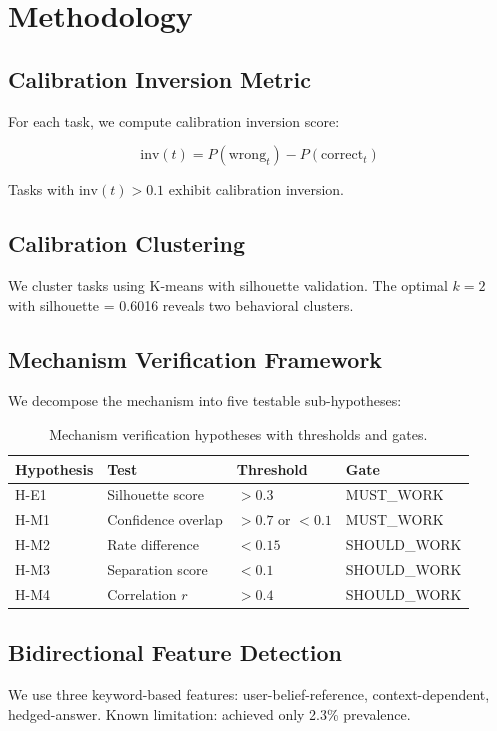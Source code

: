 \section{Methodology}

\subsection{Calibration Inversion Metric}

For each task, we compute calibration inversion score:

\begin{equation}
\text{inv}(t) = P(\text{wrong}_t) - P(\text{correct}_t)
\end{equation}

Tasks with $\text{inv}(t) > 0.1$ exhibit calibration inversion.

\subsection{Calibration Clustering}

We cluster tasks using K-means with silhouette validation. The optimal $k=2$ with silhouette = 0.6016 reveals two behavioral clusters.

\subsection{Mechanism Verification Framework}

We decompose the mechanism into five testable sub-hypotheses:

\begin{table}[h]
\centering
\begin{tabular}{@{}llll@{}}
\toprule
Hypothesis & Test & Threshold & Gate \\
\midrule
H-E1 & Silhouette score & $> 0.3$ & MUST\_WORK \\
H-M1 & Confidence overlap & $> 0.7$ or $< 0.1$ & MUST\_WORK \\
H-M2 & Rate difference & $< 0.15$ & SHOULD\_WORK \\
H-M3 & Separation score & $< 0.1$ & SHOULD\_WORK \\
H-M4 & Correlation $r$ & $> 0.4$ & SHOULD\_WORK \\
\bottomrule
\end{tabular}
\caption{Mechanism verification hypotheses with thresholds and gates.}
\label{tab:hypotheses}
\end{table}

\subsection{Bidirectional Feature Detection}

We use three keyword-based features: user-belief-reference, context-dependent, hedged-answer. Known limitation: achieved only 2.3\% prevalence.
